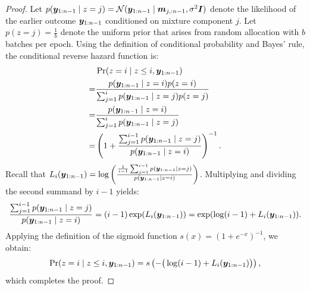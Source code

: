 \reversehazardloss*
\begin{proof}
    Let $p({\bm{y}}_{1:n-1} \mid z=j) = \mathcal{N}({\bm{y}}_{1:n-1} \mid \bm{m}_{j,:n-1}, \sigma^2 {\bm{I}})$ denote the likelihood of the earlier outcome ${\bm{y}}_{1:n-1}$ conditioned on mixture component $j$.
    Let $p(z=j) = \frac{1}{b}$ denote the uniform prior that arises from random allocation with $b$ batches per epoch.
    Using the definition of conditional probability and Bayes' rule, the conditional reverse hazard function is:
    \begin{align*}
        &\Pr(z=i \mid z \leq i, {\bm{y}}_{1:n-1})\\
        = &\frac{p({\bm{y}}_{1:n-1} \mid z=i)  p(z=i)}{\sum_{j=1}^i p({\bm{y}}_{1:n-1} \mid z=j)  p(z=j)}\\
        =& \frac{p({\bm{y}}_{1:n-1} \mid z=i)}{\sum_{j=1}^i p({\bm{y}}_{1:n-1} \mid z=j)}\\
        = & \left(1 + \frac{\sum_{j=1}^{i-1} p({\bm{y}}_{1:n-1} \mid z=j)}{p({\bm{y}}_{1:n-1} \mid z=i)}\right)^{-1}.
    \end{align*}
    Recall that $L_i({\bm{y}}_{1:n-1}) = \log \left( \frac{\frac{1}{i-1}\sum_{j=1}^{i-1} p({\bm{y}}_{1:n-1} \mid z=j)}{p({\bm{y}}_{1:n-1} \mid z=i)} \right)$.
    Multiplying and dividing the second summand by $i-1$ yields:
    \begin{equation}
        \frac{\sum_{j=1}^{i-1} p({\bm{y}}_{1:n-1} \mid z=j)}{p({\bm{y}}_{1:n-1} \mid z=i)}
        = (i-1) \exp(L_i({\bm{y}}_{1:n-1}))
        = \exp(\log(i-1) + L_i({\bm{y}}_{1:n-1})).
    \end{equation}
    Applying the definition of the sigmoid function $s(x) = (1+e^{-x})^{-1}$, we obtain:
    \begin{equation}
        \Pr(z=i \mid z \leq i, {\bm{y}}_{1:n-1}) = s\left(-\big(\log(i-1) + L_i({\bm{y}}_{1:n-1})\big)\right),
    \end{equation}
    which completes the proof.
\end{proof}

